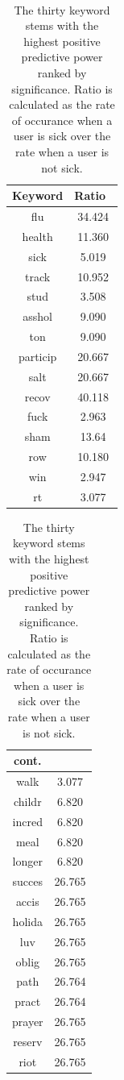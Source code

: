 \documentclass{acm_proc_article-sp}
\begin{document}
%

%
%

\appendix
\ 


\begin{table}[!ht]
\centering
\begin{tabular}{|c|c|}\hline
Keyword&Ratio\ \\ \hline
flu &  34.424\\ \hline
health &  11.360\\ \hline
sick &  5.019\\ \hline
track & 10.952 \\ \hline
stud & 3.508 \\ \hline
asshol & 9.090 \\ \hline
ton & 9.090 \\ \hline
particip & 20.667 \\ \hline
salt & 20.667 \\ \hline
recov & 40.118 \\ \hline
fuck & 2.963 \\ \hline
sham & 13.64 \\ \hline
row & 10.180 \\ \hline
win & 2.947 \\ \hline
rt & 3.077 \\ \hline
  \end{tabular}
  \hspace{1em}
\begin{tabular}{|c|c|}\hline
cont. & \\ \hline
walk & 3.077 \\ \hline
childr & 6.820 \\ \hline
incred & 6.820 \\ \hline
meal & 6.820 \\ \hline
longer &  6.820 \\ \hline
succes &  26.765 \\ \hline
accis & 26.765 \\ \hline
holida & 26.765 \\ \hline
luv & 26.765 \\ \hline
oblig & 26.765 \\ \hline
path & 26.764 \\ \hline
pract & 26.764 \\ \hline
prayer & 26.765 \\ \hline
reserv & 26.765 \\ \hline
riot & 26.765 \\ 
\hline\end{tabular}
\caption{The thirty keyword stems with the highest positive predictive power ranked by significance. Ratio is calculated as the rate of occurance when a user is sick over the rate when a user is not sick.}
\label{tab:thirty_best}
\end{table}
\end{document}

